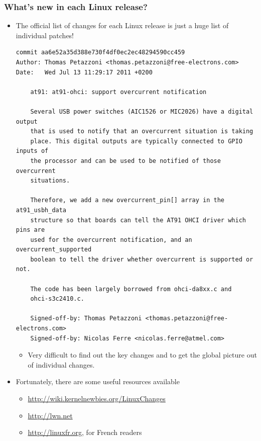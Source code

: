 \begin{frame}[fragile]
  \frametitle{What's new in each Linux release?}
  \begin{itemize}
  \item The official list of changes for each Linux release is just a
    huge list of individual patches!
\Tiny
    \begin{verbatim}
commit aa6e52a35d388e730f4df0ec2ec48294590cc459
Author: Thomas Petazzoni <thomas.petazzoni@free-electrons.com>
Date:   Wed Jul 13 11:29:17 2011 +0200

    at91: at91-ohci: support overcurrent notification

    Several USB power switches (AIC1526 or MIC2026) have a digital output
    that is used to notify that an overcurrent situation is taking
    place. This digital outputs are typically connected to GPIO inputs of
    the processor and can be used to be notified of those overcurrent
    situations.

    Therefore, we add a new overcurrent_pin[] array in the at91_usbh_data
    structure so that boards can tell the AT91 OHCI driver which pins are
    used for the overcurrent notification, and an overcurrent_supported
    boolean to tell the driver whether overcurrent is supported or not.

    The code has been largely borrowed from ohci-da8xx.c and
    ohci-s3c2410.c.

    Signed-off-by: Thomas Petazzoni <thomas.petazzoni@free-electrons.com>
    Signed-off-by: Nicolas Ferre <nicolas.ferre@atmel.com>
\end{verbatim}
\normalsize
    \begin{itemize}
    \item Very difficult to find out the key changes and to get the
      global picture out of individual changes.
    \end{itemize}
  \item Fortunately, there are some useful resources available
    \begin{itemize}
    \item \url{http://wiki.kernelnewbies.org/LinuxChanges}
    \item \url{http://lwn.net}
    \item \url{http://linuxfr.org}, for French readers
    \end{itemize}
  \end{itemize}
\end{frame}
